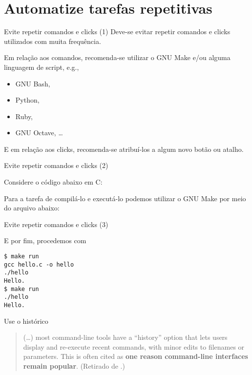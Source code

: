 \documentclass[11pt]{beamer}
\begin{document}
\section{Automatize tarefas repetitivas}
\begin{frame}{Evite repetir comandos e clicks (1)}
    Deve-se evitar repetir comandos e clicks utilizados com muita frequência.

    Em relação aos comandos, recomenda-se utilizar o GNU Make e/ou alguma
    linguagem de script, e.g.,
    \begin{itemize}
        \item GNU Bash,
        \item Python,
        \item Ruby,
        \item GNU Octave, \ldots
    \end{itemize}

    E em relação aos clicks, recomenda-se atribuí-los a algum novo botão ou
    atalho.
\end{frame}

\begin{frame}[fragile]{Evite repetir comandos e clicks (2)}
    \begin{example}
        Considere o código abaixo em C:
        
        Para a tarefa de compilá-lo e executá-lo podemos utilizar o GNU Make
        por meio do arquivo abaixo:
        
    \end{example}
\end{frame}

\begin{frame}[fragile]{Evite repetir comandos e clicks (3)}
    \begin{example}[Continuação]
         E por fim,  procedemos com
        \begin{lstlisting}
$ make run
gcc hello.c -o hello
./hello
Hello.
$ make run
./hello
Hello.
        \end{lstlisting}
    \end{example}
\end{frame}

\begin{frame}{Use o histórico}
    \begin{quotation}
        (\ldots) most command-line tools have a ``history'' option that
        lets users display and re-execute recent commands, with minor edits to
        filenames or parameters. This is often cited as \textbf{one reason command-line
        interfaces remain popular}. (Retirado de \cite{Aruliah-2012-Best}.)
    \end{quotation}
\end{frame}
\end{document}
